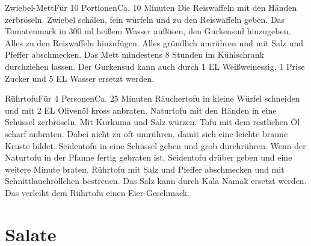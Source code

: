 \documentclass[a4paper,10pt]{article}
\begin{document}
    \newpage

    \begin{recipe}{Zwiebel-Mett}{Für 10 Portionen}{Ca. 10 Minuten}
        Die Reiswaffeln mit den Händen zerbröseln. Zwiebel schälen, fein würfeln und zu den Reiswaffeln geben.
        Das Tomatenmark in 300 ml heißem Wasser auflösen, den Gurkensud hinzugeben. Alles zu den Reiswaffeln 
        hinzufügen.
        Alles gründlich umrühren und mit Salz und Pfeffer abschmecken. Das Mett mindestens 8 Stunden im
        Kühlschrank durchziehen lassen.
        \freeform Der Gurkensud kann auch durch 1 EL Weißweinessig, 1 Prise 
        Zucker und 5 EL Wasser ersetzt werden.
    \end{recipe}
    
    \newpage
    
    \begin{recipe}{Rührtofu}{Für 4 Personen}{Ca. 25 Minuten}
        Räuchertofu in kleine Würfel schneiden und mit 2 EL Olivenöl kross 
        anbraten.
        Naturtofu mit den Händen in eine Schüssel zerbröseln. Mit Kurkuma und 
        Salz würzen. Tofu mit dem restlichen \"Ol scharf anbraten. Dabei nicht 
        zu oft umrühren, damit sich eine leichte braune Kruste bildet.
        Seidentofu in eine Schüssel geben und grob durchrühren. Wenn der 
        Naturtofu in der Pfanne fertig gebraten ist, Seidentofu drüber geben 
        und eine weitere Minute braten. Rührtofu mit Salz und Pfeffer 
        abschmecken und mit Schnittlauchr\"ollchen bestreuen.
        \freeform Das Salz kann durch Kala Namak ersetzt werden. Das verleiht 
        dem Rührtofu einen Eier-Geschmack.
    \end{recipe}

    \newpage

  
    \section{Salate}
    
\end{document}
